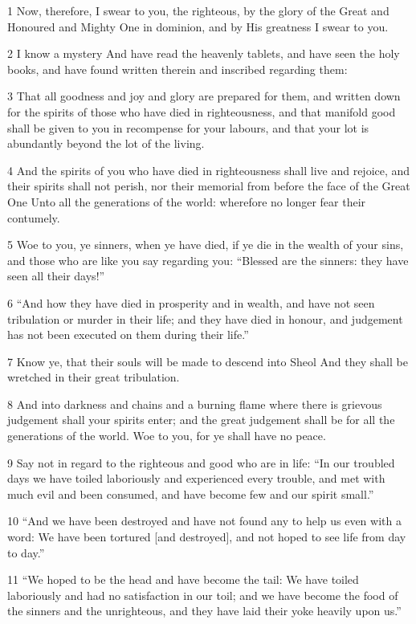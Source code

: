 \par 1 Now, therefore, I swear to you, the righteous, by the glory of the Great and Honoured and Mighty One in dominion, and by His greatness I swear to you.
\par 2 I know a mystery And have read the heavenly tablets, and have seen the holy books, and have found written therein and inscribed regarding them:
\par 3 That all goodness and joy and glory are prepared for them, and written down for the spirits of those who have died in righteousness, and that manifold good shall be given to you in recompense for your labours, and that your lot is abundantly beyond the lot of the living.
\par 4 And the spirits of you who have died in righteousness shall live and rejoice, and their spirits shall not perish, nor their memorial from before the face of the Great One Unto all the generations of the world: wherefore no longer fear their contumely.
\par 5 Woe to you, ye sinners, when ye have died, if ye die in the wealth of your sins, and those who are like you say regarding you: “Blessed are the sinners: they have seen all their days!”
\par 6 “And how they have died in prosperity and in wealth, and have not seen tribulation or murder in their life; and they have died in honour, and judgement has not been executed on them during their life.”
\par 7 Know ye, that their souls will be made to descend into Sheol And they shall be wretched in their great tribulation.
\par 8 And into darkness and chains and a burning flame where there is grievous judgement shall your spirits enter; and the great judgement shall be for all the generations of the world. Woe to you, for ye shall have no peace.
\par 9 Say not in regard to the righteous and good who are in life: “In our troubled days we have toiled laboriously and experienced every trouble, and met with much evil and been consumed, and have become few and our spirit small.”
\par 10 “And we have been destroyed and have not found any to help us even with a word: We have been tortured [and destroyed], and not hoped to see life from day to day.”
\par 11 “We hoped to be the head and have become the tail: We have toiled laboriously and had no satisfaction in our toil; and we have become the food of the sinners and the unrighteous, and they have laid their yoke heavily upon us.”
